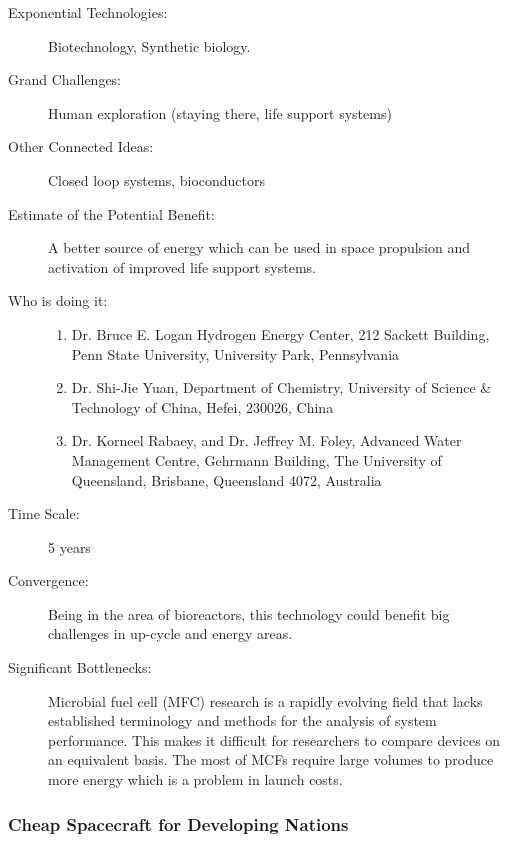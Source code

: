 \documentclass[letter,11pt]{article}
\begin{document}
\begin{description}
\item[Exponential Technologies:] Biotechnology, Synthetic biology.
\item[Grand Challenges:] Human exploration (staying there, life support systems)
\item[Other Connected Ideas:] Closed loop systems, bioconductors
\item[Estimate of the Potential Benefit:] A better source of energy which can
be used in space propulsion and activation of improved life support
systems.
\item[Who is doing it:] \hfill
\begin{enumerate}
\item Dr. Bruce E. Logan Hydrogen Energy Center, 212 Sackett Building,
Penn State University, University Park, Pennsylvania
\item Dr. Shi-Jie Yuan, Department of Chemistry, University of Science \&
Technology of China, Hefei, 230026, China
\item Dr. Korneel Rabaey, and Dr. Jeffrey M. Foley, Advanced Water
Management Centre, Gehrmann Building, The University of Queensland,
Brisbane, Queensland 4072, Australia
\end{enumerate}
\item[Time Scale:] 5 years
\item[Convergence:] Being in the area of bioreactors, this technology could
benefit big challenges in up-cycle and energy areas.
\item[Significant Bottlenecks:] Microbial fuel cell (MFC) research is a
rapidly evolving field that lacks established terminology and methods
for the analysis of system performance. This makes it difficult for
researchers to compare devices on an equivalent basis.
The most of MCFs require large volumes to produce more energy which is
a problem in launch costs.
\end{description}

\subsubsection{Cheap Spacecraft for Developing Nations}
\end{document}
